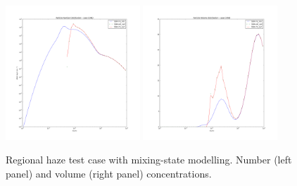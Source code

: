 \documentclass[a4paper,11pt]{article}
\begin{document}
\begin{figure}[H]
        \begin{center}
                \includegraphics[angle=0,width=0.45\textwidth]{../graph/figure_ref/dNdlogd_COND_EXT.png}
                \includegraphics[angle=0,width=0.45\textwidth]{../graph/figure_ref/dVdlogd_COND_EXT.png}
        \end{center}
\caption{Regional haze test case with mixing-state modelling. Number (left panel) and volume (right panel) concentrations.}
\label{fig-cond-ext}
\end{figure}
 
\end{document}
